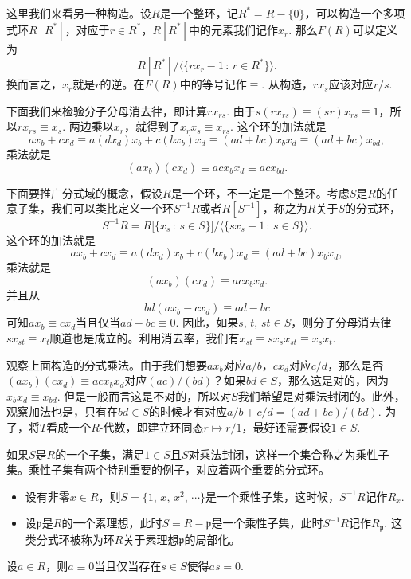 \para 这里我们来看另一种构造。设$R$是一个整环，记$R^*=R-\{0\}$，可以构造一个多项式环$R[R^*]$，对应于$r\in R^*$，$R[R^*]$中的元素我们记作$x_r$. 那么$F(R)$可以定义为
\[
	R[R^*]\big/\bigl\langle\{rx_r-1\,:\, r\in R^*\}\bigr\rangle.
\]
换而言之，$x_r$就是$r$的逆。在$F(R)$中的等号记作$\equiv$. 从构造，$rx_s$应该对应$r/s$.

下面我们来检验分子分母消去律，即计算$rx_{rs}$. 由于$s(rx_{rs})\equiv (sr)x_{rs}\equiv 1$，所以$rx_{rs}\equiv x_s$. 两边乘以$x_r$，就得到了$x_rx_s\equiv x_{rs}$. 这个环的加法就是
\[
	ax_{b}+cx_d\equiv a(dx_d)x_{b}+c(bx_{b})x_d\equiv (ad+bc)x_bx_d \equiv (ad+bc)x_{bd},
\]
乘法就是
\[
	(ax_{b})(cx_d)\equiv acx_bx_d\equiv acx_{bd}.
\]

\para 下面要推广分式域的概念，假设$R$是一个环，不一定是一个整环。考虑$S$是$R$的任意子集，我们可以类比定义一个环$S^{-1}R$或者$R[S^{-1}]$，称之为$R$关于$S$的分式环，
\[
	S^{-1}R=R\bigl[\{x_s\,:\, s\in S\}\bigr]\big/\bigl\langle\{sx_s-1\,:\, s\in S\}\bigr\rangle.
\]
这个环的加法就是
\[
	ax_{b}+cx_d\equiv a(dx_d)x_{b}+c(bx_{b})x_d\equiv (ad+bc)x_bx_d,
\]
乘法就是
\[
	(ax_{b})(cx_d)\equiv acx_bx_d.
\]
并且从
\[
	bd(ax_{b}-cx_d)\equiv ad-bc
\]
可知$ax_{b}\equiv cx_d$当且仅当$ad-bc\equiv 0$. 因此，如果$s$, $t$, $st\in S$，则分子分母消去律$sx_{st}\equiv x_t$顺道也是成立的。利用消去率，我们有$x_{st}\equiv sx_s x_{st}\equiv x_s x_t$.

观察上面构造的分式乘法。由于我们想要$ax_b$对应$a/b$，$cx_d$对应$c/d$，那么是否$(ax_{b})(cx_d)\equiv acx_bx_d$对应$(ac)/(bd)$？如果$bd\in S$，那么这是对的，因为$x_bx_d\equiv x_{bd}$. 但是一般而言这是不对的，所以对$S$我们希望是对乘法封闭的。此外，观察加法也是，只有在$bd\in S$的时候才有对应$a/b+c/d=(ad+bc)/(bd)$. 为了，将$T$看成一个$R$-代数，即建立环同态$r\mapsto r/1$，最好还需要假设$1\in S$.

如果$S$是$R$的一个子集，满足$1\in S$且$S$对乘法封闭，这样一个集合称之为乘性子集。乘性子集有两个特别重要的例子，对应着两个重要的分式环。

\begin{itemize}
	\item 设有非零$x\in R$，则$S=\{1$, $x$, $x^2$, $\cdots\}$是一个乘性子集，这时候，$S^{-1}R$记作$R_x$.

	\item 设$\mathfrak{p}$是$R$的一个素理想，此时$S=R-\mathfrak{p}$是一个乘性子集，此时$S^{-1}R$记作$R_\mathfrak{p}$. 这类分式环被称为环$R$关于素理想$\mathfrak{p}$的局部化。
\end{itemize}

\begin{lem}
设$a\in R$，则$a\equiv 0$当且仅当存在$s \in S$使得$as=0$.
\end{lem}

